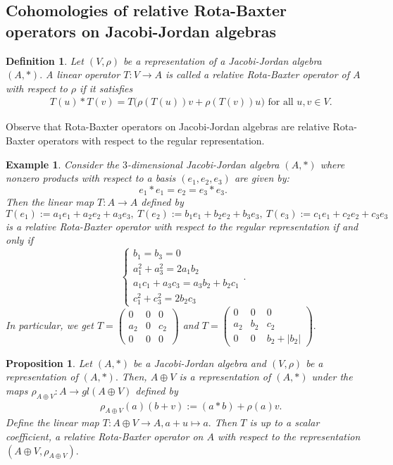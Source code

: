 \documentclass[12pt]{amsart}
\newtheorem{definition}[Theorem]{Definition}
\newtheorem{example}[Theorem]{Example}
\newtheorem{proposition}[Theorem]{Proposition}
\begin{document}
	\subsection{Cohomologies of relative Rota-Baxter operators on Jacobi-Jordan algebras}
	\begin{definition}
		Let $(V,\rho)$ be a representation of a Jacobi-Jordan algebra $(A,\ast).$ A linear
		operator $T : V\rightarrow A$ is called a relative Rota-Baxter operator of $A$ with respect to $\rho$ if it satisfies 
		\begin{eqnarray}
			&& T(u)\ast T(v)=T\Big(\rho(T(u))v+\rho(T(v))u\Big) \mbox{ for all $u,v\in V$.} \label{rbHJJ2}
		\end{eqnarray}
	\end{definition}
	Observe  that Rota-Baxter operators on Jacobi-Jordan algebras are relative Rota-Baxter operators with respect to the regular representation.
	\begin{example}
		Consider the $3$-dimensional Jacobi-Jordan algebra $(A,\ast)$ \cite{dbaf} where  nonzero products with respect to a basis $(e_1,e_2,e_3)$ are given by:
		$$e_1\ast e_1=e_2=e_3\ast e_3.$$
		Then the linear map $T: A\rightarrow A$  defined by 
		$$T(e_1):=a_1e_1+a_2e_2+a_3e_3,\ T(e_2):=b_1e_1+b_2e_2+b_3e_3,\ T(e_3):=c_1e_1+c_2e_2+c_3e_3$$ is a relative Rota-Baxter operator with respect to the regular representation if and only if\\
		$$\begin{cases}
			b_1=b_3=0\\
			a_1^2+a_3^2=2a_1b_2\\
			a_1c_1+a_3c_3=a_3b_2+b_2c_1\\
			c_1^2+c_3^2=2b_2c_3
		\end{cases} 
		.$$
		In particular, we get $T=\left(
		\begin{array}{cccc}
			0&0&0\\
			a_2&0&c_2\\
			0&0&0
		\end{array}
		\right)$ 
		and $T=\left(
		\begin{array}{cccc}
			0&0&0\\
			a_2&b_2&c_2\\
			0&0&b_2+|b_2|
		\end{array}
		\right).$
	\end{example}
	\begin{proposition}
		Let $(A, \ast)$ be a Jacobi-Jordan algebra and $(V,\rho)$ be a representation of $(A, \ast).$
		Then, $A\oplus V$ is a representation of $(A, \ast)$ under the maps $\rho_{A\oplus V}: A\rightarrow gl(A\oplus V)$ defined by
		\begin{eqnarray}
			&&\rho_{A\oplus V}(a)(b+v):=(a\ast b)+\rho(a)v.\nonumber
		\end{eqnarray}
		Define the linear map $T: A\oplus V\rightarrow A, a+u\mapsto a.$ Then $T$ is up to a scalar coefficient, a relative Rota-Baxter operator on $A$ with
		respect to the representation $(A\oplus V,\rho_{A\oplus V}).$
	\end{proposition}
\end{document}

